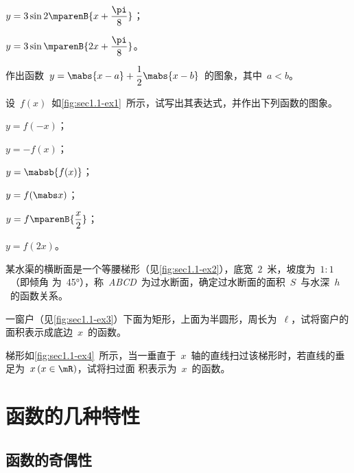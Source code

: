 \begin{exercise}
\begin{exlistcols}[3]
  \item $y=3\sin2\mparenB{x+\dfrac\pi8}$；
  \item $y=3\sin\mparenB{2x+\dfrac\pi8}$。
\end{exlistcols}
\item 作出函数~$y=\mabs{x-a}+\dfrac12\mabs{x-b}$~的图象，其中~$a<b$。
\item 设~$f(x)$~如\ref{fig:sec1.1-ex1}~所示，试写出其表达式，并作出下列函数的图象。
\begin{exlistcols}[3]
  \item $y=f(-x)$；
  \item $y=-f(x)$；
  \item $y=\mabsb{f(x)}$；
  \item $y=f(\mabs x)$；
  \item $y=f\mparenB{\dfrac x2}$；
  \item $y=f(2x)$。
\end{exlistcols}
\item 某水渠的横断面是一个等腰梯形（见\ref{fig:sec1.1-ex2}），底宽~$2$~米，坡度为~$1:1$~（即倾角
为~\ang{45}），称~\textit{ABCD}~为过水断面，确定过水断面的面积~$S$~与水深~$h$~的函数关系。

\begin{figure}
\begin{floatrow}
\figurebox{\caption{}\label{fig:sec1.1-ex1}}{\somefigure}
\figurebox{\caption{}\label{fig:sec1.1-ex2}}{\somefigure}
\end{floatrow}
\newFRline
\begin{floatrow}
\figurebox{\caption{}\label{fig:sec1.1-ex3}}{\somefigure}
\figurebox{\caption{}\label{fig:sec1.1-ex4}}{\somefigure}
\end{floatrow}
\end{figure}

\item 一窗户（见\ref{fig:sec1.1-ex3}）下面为矩形，上面为半圆形，周长为~$\ell$，试将窗户的面积表示成底边~$x$~的函数。
\item 梯形如\ref{fig:sec1.1-ex4}~所示，当一垂直于~$x$~轴的直线扫过该梯形时，若直线的垂足为~$x\mcond{x\in\mR}$，试将扫过面
积表示为~$x$~的函数。
\end{exercise}



\section{函数的几种特性}

\subsection{函数的奇偶性}


